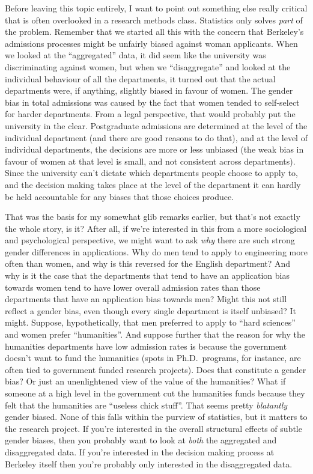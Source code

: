 \documentclass[
]{book}
\begin{document}
Before leaving this topic entirely, I want to point out something else really critical that is often overlooked in a research methods class. Statistics only solves \emph{part} of the problem. Remember that we started all this with the concern that Berkeley's admissions processes might be unfairly biased against woman applicants. When we looked at the ``aggregated'' data, it did seem like the university was discriminating against women, but when we ``disaggregate'' and looked at the individual behaviour of all the departments, it turned out that the actual departments were, if anything, slightly biased in favour of women. The gender bias in total admissions was caused by the fact that women tended to self-select for harder departments. From a legal perspective, that would probably put the university in the clear. Postgraduate admissions are determined at the level of the individual department (and there are good reasons to do that), and at the level of individual departments, the decisions are more or less unbiased (the weak bias in favour of women at that level is small, and not consistent across departments). Since the university can't dictate which departments people choose to apply to, and the decision making takes place at the level of the department it can hardly be held accountable for any biases that those choices produce.

That was the basis for my somewhat glib remarks earlier, but that's not exactly the whole story, is it? After all, if we're interested in this from a more sociological and psychological perspective, we might want to ask \emph{why} there are such strong gender differences in applications. Why do men tend to apply to engineering more often than women, and why is this reversed for the English department? And why is it the case that the departments that tend to have an application bias towards women tend to have lower overall admission rates than those departments that have an application bias towards men? Might this not still reflect a gender bias, even though every single department is itself unbiased? It might.
Suppose, hypothetically, that men preferred to apply to ``hard sciences'' and women prefer ``humanities''. And suppose further that the reason for why the humanities departments have low admission rates is because the government doesn't want to fund the humanities (spots in Ph.D.~programs, for instance, are often tied to government funded research projects). Does that constitute a gender bias? Or just an unenlightened view of the value of the humanities? What if someone at a high level in the government cut the humanities funds because they felt that the humanities are ``useless chick stuff''. That seems pretty \emph{blatantly} gender biased. None of this falls within the purview of statistics, but it matters to the research project. If you're interested in the overall structural effects of subtle gender biases, then you probably want to look at \emph{both} the aggregated and disaggregated data. If you're interested in the decision making process at Berkeley itself then you're probably only interested in the disaggregated data.
\end{document}
